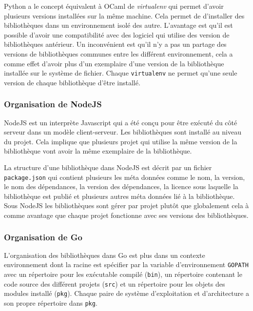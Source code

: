 Python a le concept équivalent à OCaml de \textit{virtualenv} qui permet d'avoir plusieurs
versions installées sur la même machine. Cela permet de d'installer des
bibliothèques dans un environnement isolé des autre. L'avantage est qu'il est
possible d'avoir une compatibilité avec des logiciel qui utilise des version de
bibliothèques antérieur. Un inconvénient est qu'il n'y a pas un partage des
versions de bibliothèques communes entre les différent environnement, cela a
comme effet d'avoir plus d'un exemplaire d'une version de la bibliothèque installée
sur le système de fichier. Chaque \texttt{virtualenv} ne permet qu'une seule version de
chaque bibliothèque d'être installé.


\subsubsection{Organisation de NodeJS}
NodeJS est un interprète Javascript qui a été conçu pour être exécuté
du côté serveur dans un modèle client-serveur. Les bibliothèques sont
installé au niveau du projet. Cela implique que plusieurs projet qui
utilise la même version de la bibliothèque vont avoir la même exemplaire
de la bibliothèque.

La structure d'une bibliothèque dans NodeJS est décrit par un fichier
\texttt{package.json} qui contient plusieurs les méta données comme
le nom, la version, le nom des dépendances, la version des dépendances,
la licence sous laquelle la bibliothèque est publié et plusieurs autres
méta données lié à la bibliothèque. Sous NodeJS les bibliothèques sont gérer
par projet plutôt que globalement cela à comme avantage que chaque projet
fonctionne avec ses versions des bibliothèques.

\todo{}
\subsubsection{Organisation de Go}
L'organisation des bibliothèques dans Go est plus dans un
contexte environnement dont la racine est spécifier par la variable d'environnement \texttt{GOPATH}
avec un répertoire pour les exécutable compilé (\texttt{bin}),
un répertoire contenant le code source des différent projets (\texttt{src}) et un
répertoire pour les objets des modules installé (\texttt{pkg}). Chaque paire de système
d'exploitation et d'architecture a son propre répertoire dans \texttt{pkg}.

